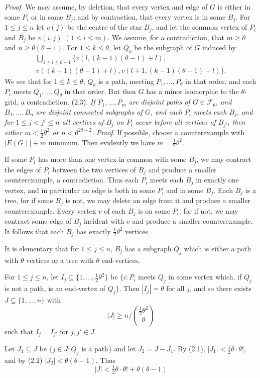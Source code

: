 \textit{Proof}. We may assume, by deletion, that every vertex and edge of $G$ is
either in some $P_i$ or in some $B_j$; and by contraction, that every vertex is in
some $B_j$. For $1\le j\le n$ let $v(j)$ be the centre of the star $B_j$, and let the
common vertex of $P_i$ and $B_j$ be $v(i, j)$ $(1\le i\le m)$. We assume, for a
contradiction, that $m\ge\theta$ and $n\ge\theta(\theta-1)$. For $1\le k\le\theta$, let $Q_k$ be the
subgraph of $G$ induced by
\begin{multline*}
\bigcup_{1\le l\le\theta-1}\{v(l, (k-1)(\theta-1)+l),\\
v((k-1)(\theta-1)+l), v(l+1, (k-1)(\theta-1)+l)\}.
\end{multline*}
We see that for $1\le k\le\theta$, $Q_k$ is a path, meeting $P_1,..., P_\theta$ in that order, and
each $P_i$ meets $Q_1,..., Q_\theta$ in that order. But then $G$ has a minor isomorphic to
the $\theta$-grid, a contradiction.
\stmt
(2.3). \textit{If $P_1,..., P_m$ are disjoint paths of $G\in\mathscr{F}_\theta$, and $B_1,..., B_n$ are disjoint
connected subgraphs of $G$, and each $P_i$ meets each $B_j$, and for $1\le j<j'\le n$
all vertices of $B_j$ on $P_i$ occur before all vertices of $B_{j'}$, then either $m<\frac12\theta^2$ or
$n<\theta^{2\theta-2}$.}
\stmt
\textit{Proof}. If possible, choose a counterexample with $|E(G)|+m$ minimum.
Then evidently we have $m=\frac12\theta^2$.

If some $P_i$ has more than one vertex in common with some $B_j$, we may
contract the edges of $P_i$ between the two vertices of $B_j$ and produce a smaller
counterexample, a contradiction. Thus each $P_i$ meets each $B_j$ in exactly one
vertex, and in particular no edge is both in some $P_i$ and in some $B_j$. Each $B_j$
is a tree, for if some $B_j$ is not, we may delete an edge from it and produce a
smaller counterexample. Every vertex $v$ of each $B_j$ is on some $P_i$; for if not,
we may contract some edge of $B_j$ incident with $v$ and produce a smaller
counterexample. It follows that each $B_j$ has exactly $\frac12\theta^2$ vertices.

It is elementary that for $1\le j\le n$, $B_j$ has a subgraph $Q_j$ which is either a
path with $\theta$ vertices or a tree with $\theta$ end-vertices.

For $1\le j\le n$, let $I_j\subseteq\{1,..., \frac12\theta^2\}$ be $\{i\colon P_i$ meets $Q_j$ in some vertex which,
if $Q_j$ is not a path, is an end-vertex of $Q_j\}$. Then $|I_j|=\theta$ for all $j$, and so there
exists $J\subseteq\{1,..., n\}$ with
\begin{equation*}
|J|\ge n\Big/\binom{\frac12\theta^2}{\theta}
\end{equation*}
such that $I_j=I_{j'}$ for $j, j'\in J$.

Let $J_1\subseteq J$ be $\{j\in J\colon Q_j$ is a path$\}$ and let $J_2=J-J_1$. By (2.1),
$|J_1|<\frac12\theta\cdot\theta!$, and by (2.2) $|J_2|<\theta(\theta-1)$. Thus
\begin{equation*}
|J|<\tfrac12\theta\cdot\theta!+\theta(\theta-1)
\end{equation*}
